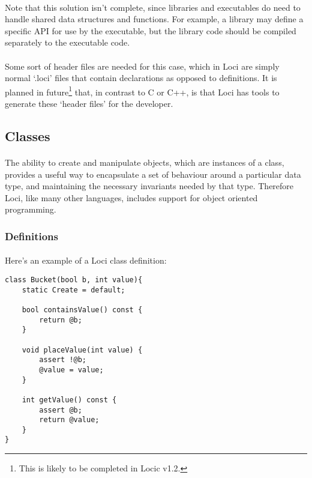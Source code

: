 \documentclass[12pt,twoside,notitlepage]{report}
\begin{document}
\paragraph{}
Note that this solution isn't complete, since libraries and executables do need to handle shared data structures and functions. For example, a library may define a specific API for use by the executable, but the library code should be compiled separately to the executable code.

\paragraph{}
Some sort of header files are needed for this case, which in Loci are simply normal `.loci' files that contain declarations as opposed to definitions. It is planned in future\footnote{This is likely to be completed in Locic v1.2.} that, in contrast to C or C++, is that Loci has tools to generate these `header files' for the developer.

\clearpage

\subsection{Classes}

\paragraph{}
The ability to create and manipulate objects, which are instances of a class, provides a useful way to encapsulate a set of behaviour around a particular data type, and maintaining the necessary invariants needed by that type. Therefore Loci, like many other languages, includes support for object oriented programming.

\subsubsection{Definitions}

\paragraph{}
Here's an example of a Loci class definition:

\begin{lstlisting}
class Bucket(bool b, int value){
	static Create = default;
	
	bool containsValue() const {
		return @b;
	}
	
	void placeValue(int value) {
		assert !@b;
		@value = value;
	}
	
	int getValue() const {
		assert @b;
		return @value;
	}
}
\end{lstlisting}
\end{document}
